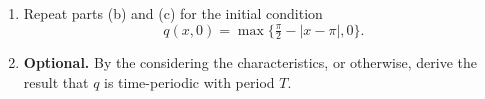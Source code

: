 \documentclass[11pt]{article}
\begin{document}
\begin{problem}
\begin{enumerate}
                the initial condition in Eq.~\eqref{eq:lwic}, calculate the $L_2$ norm
                between the numerical solution at $t=T$ and the exact answer. Determine
                the order of convergence.\footnote{When determining the order of
                  convergence, you are interested in the asymptotic properites of error
                  as $m$ gets large. You can ignore initial transients in error.}
          \item Repeat parts (b) and (c) for the initial condition
                \begin{equation}
                  q(x,0) = \max\{ \tfrac{\pi}{2}-|x-\pi|,0\}.
                \end{equation}
          \item \textbf{Optional.} By the considering the characteristics, or otherwise,
                derive the result that $q$ is time-periodic with period $T$.
        \end{enumerate}
\end{problem}
\end{document}
